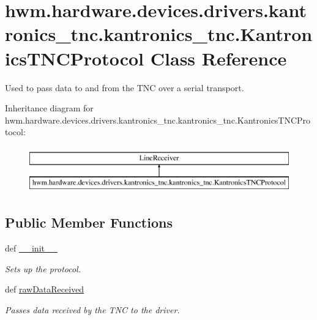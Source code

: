 \hypertarget{classhwm_1_1hardware_1_1devices_1_1drivers_1_1kantronics__tnc_1_1kantronics__tnc_1_1_kantronics_t_n_c_protocol}{\section{hwm.\-hardware.\-devices.\-drivers.\-kantronics\-\_\-tnc.\-kantronics\-\_\-tnc.\-Kantronics\-T\-N\-C\-Protocol Class Reference}
\label{classhwm_1_1hardware_1_1devices_1_1drivers_1_1kantronics__tnc_1_1kantronics__tnc_1_1_kantronics_t_n_c_protocol}
}


Used to pass data to and from the T\-N\-C over a serial transport.  


Inheritance diagram for hwm.\-hardware.\-devices.\-drivers.\-kantronics\-\_\-tnc.\-kantronics\-\_\-tnc.\-Kantronics\-T\-N\-C\-Protocol\-:\begin{figure}[H]
\begin{center}
\leavevmode
\includegraphics[height=2.000000cm]{classhwm_1_1hardware_1_1devices_1_1drivers_1_1kantronics__tnc_1_1kantronics__tnc_1_1_kantronics_t_n_c_protocol}
\end{center}
\end{figure}
\subsection*{Public Member Functions}
\begin{DoxyCompactItemize}
\item 
def \hyperlink{classhwm_1_1hardware_1_1devices_1_1drivers_1_1kantronics__tnc_1_1kantronics__tnc_1_1_kantronics_t_n_c_protocol_ade3ffb17d2ee2bc90ad182f684dc1184}{\-\_\-\-\_\-init\-\_\-\-\_\-}
\begin{DoxyCompactList}\small\item\em Sets up the protocol. \end{DoxyCompactList}\item 
def \hyperlink{classhwm_1_1hardware_1_1devices_1_1drivers_1_1kantronics__tnc_1_1kantronics__tnc_1_1_kantronics_t_n_c_protocol_a19797e64dcf6e4869829e9763eef72e7}{raw\-Data\-Received}
\begin{DoxyCompactList}\small\item\em Passes data received by the T\-N\-C to the driver. \end{DoxyCompactList}\end{DoxyCompactItemize}
